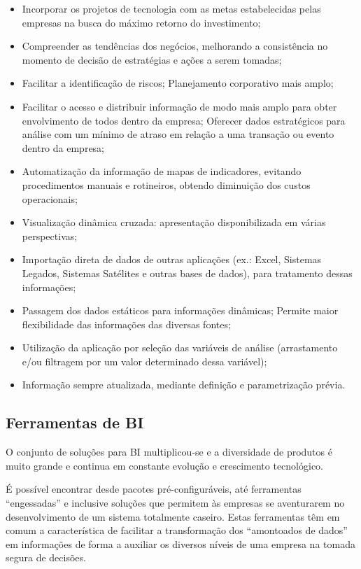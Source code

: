 \begin{itemize}

    \item Incorporar os projetos de tecnologia com as metas estabelecidas pelas empresas na busca do máximo retorno do investimento;
    \item Compreender as tendências dos negócios, melhorando a consistência no momento de decisão de estratégias e ações a serem tomadas;
    \item Facilitar a identificação de riscos;
    Planejamento corporativo mais amplo;
    \item Facilitar o acesso e distribuir informação de modo mais amplo para obter envolvimento de todos dentro da empresa;
    Oferecer dados estratégicos para análise com um mínimo de atraso em relação a uma transação ou evento dentro da empresa;
    \item Automatização da informação de mapas de indicadores, evitando procedimentos manuais e rotineiros, obtendo diminuição dos custos operacionais;
    \item Visualização dinâmica cruzada: apresentação disponibilizada em várias perspectivas;
    \item Importação direta de dados de outras aplicações (ex.: Excel, Sistemas Legados, Sistemas Satélites e outras bases de dados), para tratamento dessas informações;
    \item Passagem dos dados estáticos para informações dinâmicas;
    Permite maior flexibilidade das informações das diversas fontes;
    \item Utilização da aplicação por seleção das variáveis de análise (arrastamento e/ou filtragem por um valor determinado dessa variável);
    \item Informação sempre atualizada, mediante definição e parametrização prévia.
 
 \end{itemize}
 
\subsection{Ferramentas de BI}

O conjunto de soluções para BI multiplicou-se e a diversidade de produtos é muito grande e continua em constante evolução e crescimento tecnológico.

É possível encontrar desde pacotes pré-configuráveis, até ferramentas “engessadas” e inclusive soluções que permitem às empresas se aventurarem no desenvolvimento de um sistema totalmente caseiro.
Estas ferramentas têm em comum a característica de facilitar a transformação dos “amontoados de dados” em informações de forma a auxiliar os diversos níveis de uma empresa na tomada segura de decisões.

